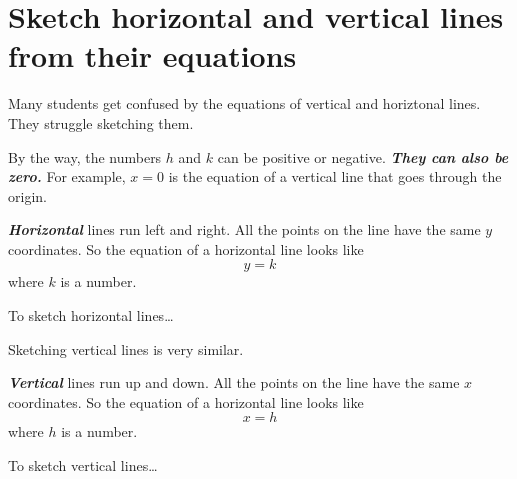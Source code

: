 \section*{Sketch horizontal and vertical lines from their equations}

Many students get confused by the equations of vertical and horiztonal lines.
They struggle sketching them.


By the way, the numbers $h$ and $k$ can be positive or negative.
{\bfseries\itshape They can also be zero.}
For example, $x=0$ is the equation of a vertical line that goes through the origin.

\begin{center}
    \begin{tcolorbox}[width=5in]
        {\bfseries\itshape Horizontal} lines run left and right.
        All the points on the line have the same $y$ coordinates.
        So the equation of a horizontal line looks like
        \[ y = k \]
        where $k$ is a number.
    \end{tcolorbox}
\end{center}

\begin{myConceptSteps}{To sketch horizontal lines\dots}
\end{myConceptSteps}







Sketching vertical lines is very similar.
\begin{center}
    \begin{tcolorbox}[width=5in]
        {\bfseries\itshape Vertical} lines run up and down.
        All the points on the line have the same $x$ coordinates.
        So the equation of a horizontal line looks like
        \[ x = h \]
        where $h$ is a number.
    \end{tcolorbox}
\end{center}

\begin{myConceptSteps}{To sketch vertical lines\dots}
\end{myConceptSteps}






